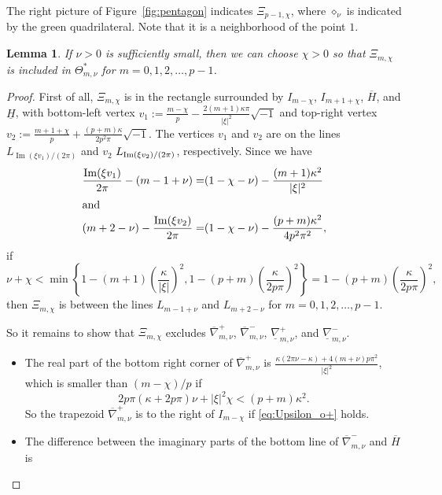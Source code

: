 \documentclass[a4paper,dvipdfmx]{amsart}
\theoremstyle{plain}
\newtheorem{lem}[thm]{Lemma}
\theoremstyle{definition}
\theoremstyle{remark}
\renewcommand{\Im}{\operatorname{Im}}
\renewcommand{\i}{\sqrt{-1}}
\numberwithin{equation}{section}
\begin{document}
The right picture of Figure~\ref{fig:pentagon} indicates $\Xi_{p-1,\chi}$, where $\diamond_{\nu}$ is indicated by the green quadrilateral.
Note that it is a neighborhood of the point $1$.
\begin{lem}
If $\nu>0$ is sufficiently small, then we can choose $\chi>0$ so that $\Xi_{m,\chi}$ is included in $\Theta^{\ast}_{m,\nu}$ for $m=0,1,2,\dots,p-1$.
\end{lem}
\begin{proof}
First of all, $\Xi_{m,\chi}$ is in the rectangle surrounded by $I_{m-\chi}$, $I_{m+1+\chi}$, $\overline{H}$, and $\underline{H}$, with bottom-left vertex $v_{1}:=\frac{m-\chi}{p}-\frac{2(m+1)\kappa\pi}{|\xi|^2}\i$ and top-right vertex $v_{2}:=\frac{m+1+\chi}{p}+\frac{(p+m)\kappa}{2p^2\pi}\i$.
The vertices $v_{1}$ and $v_{2}$ are on the lines $L_{\Im(\xi v_{1})/(2\pi)}$ and $v_{2}$ $L_{\Im(\xi v_{\rm2})/(2\pi)}$, respectively.
Since we have
\begin{align*}
  \frac{\Im(\xi v_{1})}{2\pi}-(m-1+\nu)
  =&
  (1-\chi-\nu)
  -
  \frac{(m+1)\kappa^2}{|\xi|^2}
  \\
  \intertext{and}
  (m+2-\nu)-\frac{\Im(\xi v_{2})}{2\pi}
  =&
  (1-\chi-\nu)-\frac{(p+m)\kappa^2}{4p^2\pi^2},
\end{align*}
if
\begin{equation}\label{eq:Upsilon_L}
  \nu+\chi
  <
  \min
  \left\{
    1-(m+1)\left(\frac{\kappa}{|\xi|}\right)^2,
    1-(p+m)\left(\frac{\kappa}{2p\pi}\right)^2
  \right\}
  =
  1-(p+m)\left(\frac{\kappa}{2p\pi}\right)^2,
\end{equation}
then $\Xi_{m,\chi}$ is between the lines $L_{m-1+\nu}$ and $L_{m+2-\nu}$ for $m=0,1,2,\dots,p-1$.
\par
So it remains to show that $\Xi_{m,\chi}$ excludes $\overline{\nabla}^{+}_{m,\nu}$, $\overline{\nabla}^{-}_{m,\nu}$, $\underline{\nabla}^{+}_{m,\nu}$, and $\underline{\nabla}^{-}_{m,\nu}$.
\begin{itemize}
\item
The real part of the bottom right corner of $\overline{\nabla}^{+}_{m,\nu}$ is $\frac{\kappa(2\pi\nu-\kappa)+4(m+\nu)p\pi^2}{|\xi|^2}$, which is smaller than $(m-\chi)/p$ if
\begin{equation}\label{eq:Upsilon_o+}
  2p\pi(\kappa+2p\pi)\nu+|\xi|^2\chi<(p+m)\kappa^2.
\end{equation}
So the trapezoid $\overline{\nabla}^{+}_{m,\nu}$ is to the right of $I_{m-\chi}$ if \eqref{eq:Upsilon_o+} holds.
\item
The difference between the imaginary parts of the bottom line of $\overline{\nabla}^{-}_{m,\nu}$ and $\overline{H}$ is

\end{itemize}
\end{proof}
\end{document}
